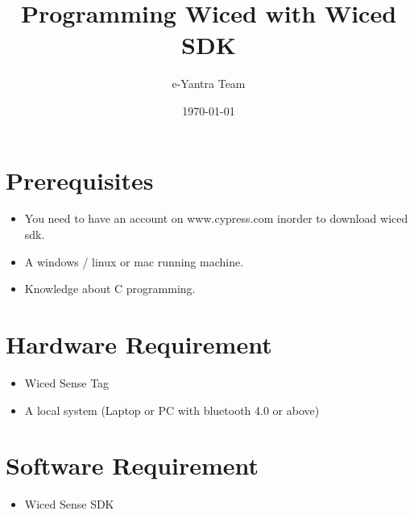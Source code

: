 \documentclass[11pt,a4paper]{article}
\begin{document}
\begin{titlepage}
\title{Programming Wiced with Wiced SDK}
\author{e-Yantra Team}
\date{\today}
\maketitle
\end{titlepage}
 \tableofcontents
 
 
 \newpage
	\section{Prerequisites}
	\begin{itemize}
	\item You need to have an account on www.cypress.com inorder to download wiced sdk.
	\item A windows / linux or mac running machine.
	\item Knowledge about C programming.
	\end{itemize}
	
	\section{Hardware Requirement}
	\begin{itemize}
	\item Wiced Sense Tag
	\item A local system (Laptop or PC with bluetooth 4.0 or above)
	\end{itemize}
	
	\section{Software Requirement}
	\begin{itemize}
	\item Wiced Sense SDK
	\end{itemize}
	
	
\newpage
\end{document}
